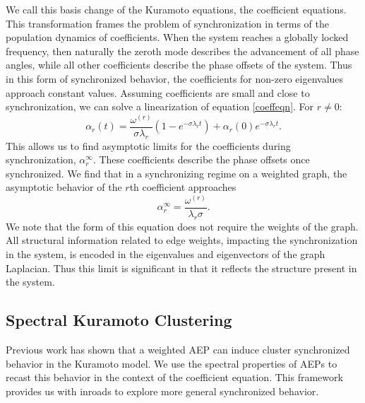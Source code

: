 \documentclass[%
 aip,
 amsmath,amssymb,
preprint,
reprint, onecolumn %
]{revtex4-1}
\begin{document}
We call this basis change of the Kuramoto equations, the coefficient equations. This transformation frames the problem of synchronization in terms of the population dynamics of coefficients. When the system reaches a globally locked frequency, then naturally the zeroth mode describes the advancement of all phase angles, while all other coefficients describe the phase offsets of the system. Thus in this form of synchronized behavior,  the coefficients for non-zero eigenvalues approach constant values.\cite{kalloniatis_incoherence_2010} Assuming coefficients are small and close to synchronization, we can solve a linearization of equation \ref{coeffeqn}. For $r\neq 0$:
\begin{equation}\label{eqn:linearcoeff}
    \alpha_r(t) = \frac{\omega^{(r)}}{\sigma \lambda_r}(1-e^{-\sigma\lambda_r t}) + \alpha_r(0)e^{-\sigma \lambda_r t}.
\end{equation}
This allows us to find asymptotic limits for the coefficients during synchronization, $\alpha_r^\infty$. These coefficients describe the phase offsets once synchronized. We find that in a synchronizing regime on a weighted graph, the asymptotic behavior of the $r$th coefficient approaches
\begin{equation}\label{eqn:limitcoeff}
    \alpha_r^{\infty} =\frac{\omega^{(r)}}{\lambda_r \sigma}.
\end{equation}
We note that the form of this equation does not require the weights of the graph. All structural information related to edge weights, impacting the synchronization in the system, is encoded in the eigenvalues and eigenvectors of the graph Laplacian. Thus this limit is significant in that it reflects the structure present in the system.




\subsection{Spectral Kuramoto Clustering}

Previous work has shown that a weighted AEP can induce cluster synchronized behavior in the Kuramoto model.\cite{kato_cluster_2023,menara_stability_2020,schaub_graph_2016} We use the spectral properties of AEPs to recast this behavior in the context of the coefficient equation. This framework provides us with inroads to explore more general synchronized behavior.
\end{document}
